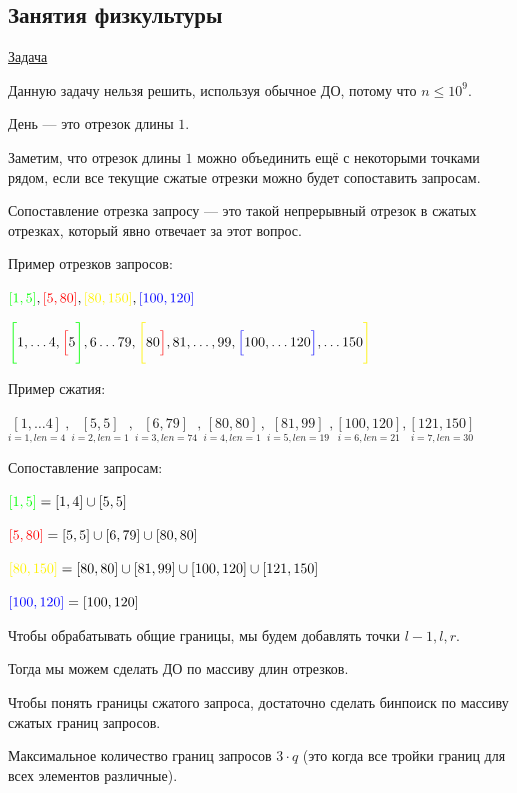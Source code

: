 \pagebreak

\subsection{Занятия физкультуры}

\href{https://codeforces.com/contest/915/problem/E}{Задача} \href{https://codeforces.com/contest/915/submission/106223693}{}

Данную задачу нельзя решить, используя обычное ДО, потому что $n \le 10^9$.

День --- это отрезок длины $1$.

Заметим, что отрезок длины $1$ можно объединить ещё с некоторыми точками рядом, если все текущие сжатые отрезки можно будет сопоставить запросам.

Сопоставление отрезка запросу --- это такой непрерывный отрезок в сжатых отрезках, который явно отвечает за этот вопрос.
\down

Пример отрезков запросов:

$\green{[1, 5]}, \red{[5, 80]}, \yellow{[80, 150]}, \blue{[100, 120]}$

$\green{\Bigg[} 1, \ldots 4, \red{\Big[} 5 \green{\Bigg]}, 6 \ldots 79, \yellow{\Bigg[}80 \red{\Big]}, 81, \ldots, 99, \blue{\Big[}100, \ldots 120 \blue{\Big]}, \ldots 150 \yellow{\Bigg]}$
\down

Пример сжатия:

$\underset{i=1, len = 4}{[1, \ldots 4]}, \underset{i=2, len=1}{[5, 5]}, \underset{i=3, len=74}{[6, 79]}, \underset{i=4, len=1}{[80, 80]}, \underset{i=5, len=19}{[81, 99]}, \underset{i=6, len=21}{[100, 120]}, \underset{i=7, len=30}{[121, 150]}$
\down

Сопоставление запросам:

${\color{green}{[1, 5]}} = [1, 4] \cup [5, 5]$

${\color{red}{[5, 80]}} = [5, 5] \cup [6, 79] \cup [80, 80]$

$\yellow{[80, 150]} = [80, 80] \cup [81, 99] \cup [100, 120] \cup [121, 150]$

${\color{blue}{[100, 120]}} = [100, 120]$
\down


Чтобы обрабатывать общие границы, мы будем добавлять точки $l-1,l,r$.

Тогда мы можем сделать ДО по массиву длин отрезков.

Чтобы понять границы сжатого запроса, достаточно сделать бинпоиск по массиву сжатых границ запросов.

Максимальное количество границ запросов $3 \cdot q$ (это когда все тройки границ для всех элементов различные).

